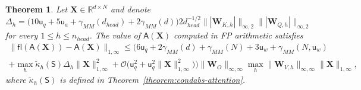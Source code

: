 \documentclass[namedate,webpdf,imanum]{ima-authoring-template}
\newcommand{\Real}{\mathbb{R}}
\newcommand{\Matrix}[1]{\mathbf{#1}}
\newcommand{\Norm}[3][]{#1\| #2 #1\|_{\mathrm{#3}}}
\newcommand{\Layer}[1]{\mathsf{#1}}
\newcommand{\fl}[2][]{\mathsf{fl}#1( #2 #1)}
\newcommand{\uh}{\mathsf{u}}
\newcommand{\Oh}[2][]{\mathcal{O}#1( #2 #1)}
\newtheorem{theorem}{Theorem}[section]%
\numberwithin{equation}{section}
\begin{document}
\begin{theorem}
\label{theorem:rounding-attn}
Let $\Matrix{X} \in \Real^{d \times N}$ and denote
\begin{equation*}
    \Delta_h = \Big(10 \uh_{q} + 5\uh_{a} + \gamma_{MM}(d_{head}) + 2\gamma_{MM}(d) \Big) 2 d_{head}^{-1/2} \Norm{|\Matrix{W}_{K,h}|}{\infty,2} \Norm{|\Matrix{W}_{Q,h}|}{\infty,2}
\end{equation*}
for every $1 \leq h \leq n_{head}$.
The value of $\Layer{A}(\Matrix{X})$ computed in FP arithmetic satisfies
\begin{multline*}
    \Norm{\fl{\Layer{A}(\Matrix{X})} - \Layer{A}(\Matrix{X})}{1,\infty} \leq \Big( 6 \uh_{q} + 2\gamma_{MM}(d) + \gamma_{MM}(N) + 3 \uh_{w} + \gamma_{MM}(N, \uh_w) \\
    + \max_h \tilde{\kappa}_{h}(\Layer{S}) \Delta_h \Norm{\Matrix{X}}{1,\infty}^2 + \Oh[\big]{\uh_q^2 + \uh_q^2 \Norm{\Matrix{X}}{1,\infty}^2} \Big) \Norm{\Matrix{W}_O}{\infty,\infty} \max_h \Norm{\Matrix{W}_{V,h}}{\infty,\infty} \Norm{\Matrix{X}}{1,\infty},
\end{multline*}
where $\tilde{\kappa}_{h}(\Layer{S})$ is defined in Theorem~\ref{theorem:condabs-attention}.
\end{theorem}
\end{document}
